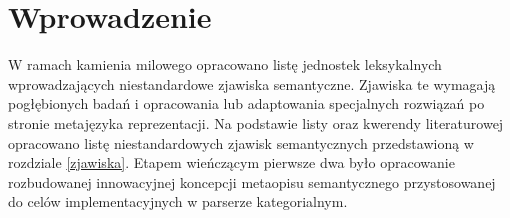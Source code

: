 \documentclass[12pt]{mwart}
\theoremstyle{remark}
\begin{document}
{\noindent{}}
\thispagestyle{empty}
\newpage


\section{Wprowadzenie}

W ramach kamienia milowego opracowano listę jednostek leksykalnych wprowadzających niestandardowe zjawiska semantyczne. 
Zjawiska te wymagają pogłębionych badań i opracowania lub adaptowania specjalnych rozwiązań po stronie metajęzyka reprezentacji. 
Na podstawie listy oraz kwerendy literaturowej opracowano listę niestandardowych 
zjawisk semantycznych przedstawioną w rozdziale \ref{zjawiska}. Etapem wieńczącym pierwsze dwa było opracowanie 
rozbudowanej innowacyjnej koncepcji metaopisu semantycznego przystosowanej do celów implementacyjnych w parserze kategorialnym.

\end{document}
